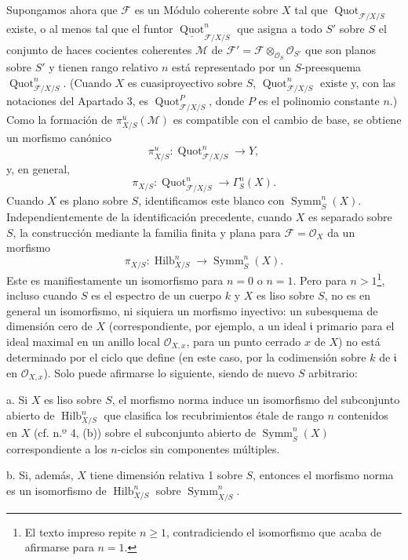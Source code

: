 \documentclass[11pt,twoside,openany]{book}
\numberwithin{equation}{section}
\newcommand{\src}[1]{%
  \phantomsection\hypertarget{src:#1}{}%
  \marginpar{\raggedleft\footnotesize\sffamily #1}%
}
\theoremstyle{plain}
\theoremstyle{definition}
\theoremstyle{remark}
\newcommand{\FgaUnitKey}{frontmatter}
\renewcommand{\src}[1]{%
  \phantomsection\hypertarget{src:\FgaUnitKey:#1}{}%
  \marginpar{\raggedleft\footnotesize\sffamily #1}%
}
\theoremstyle{plain}
\theoremstyle{definition}
\theoremstyle{remark}
\begin{document}
Supongamos ahora que $\mathcal F$ es un Módulo coherente sobre $X$ tal que
$\operatorname{Quot}_{\mathcal F/X/S}$ existe, o al menos tal que el funtor
$\underline{\operatorname{Quot}}^n_{\mathcal F/X/S}$ que asigna a todo $S'$
sobre $S$ el conjunto de haces cocientes coherentes $\mathcal M$ de
$\mathcal F'=\mathcal F\otimes_{\mathcal O_S}\mathcal O_{S'}$ que son planos
sobre $S'$ y tienen rango relativo $n$ está representado por un $S$-preesquema
$\operatorname{Quot}^n_{\mathcal F/X/S}$. (Cuando $X$ es cuasiproyectivo
sobre $S$, $\operatorname{Quot}^n_{\mathcal F/X/S}$ existe y, con las
notaciones del Apartado 3, es $\operatorname{Quot}^P_{\mathcal F/X/S}$, donde
$P$ es el polinomio constante $n$.) Como la formación de
$\pi^u_{X/S}(\mathcal M)$ es compatible con el cambio de base, se obtiene un
morfismo canónico
\[
\pi^u_{X/S}:\operatorname{Quot}^n_{\mathcal F/X/S}\longrightarrow Y,
\]
y, en general,
\[
\pi_{X/S}:\operatorname{Quot}^n_{\mathcal F/X/S}
\longrightarrow\Gamma^n_S(X).
\]
Cuando $X$ es plano sobre $S$, identificamos este blanco con $\operatorname{Symm}^n_S(X)$.
Independientemente de la identificación precedente, cuando $X$ es separado sobre $S$, la construcción mediante la familia finita y plana para $\mathcal F=\mathcal O_X$ da un morfismo
\[
\pi_{X/S}:\operatorname{Hilb}^n_{X/S}
\longrightarrow\operatorname{Symm}^n_S(X).
\]
Este es manifiestamente un isomorfismo para $n=0$ o $n=1$. Pero para
$n>1$\footnote{El texto impreso repite $n\geq1$, contradiciendo el
isomorfismo que acaba de afirmarse para $n=1$.}, incluso cuando $S$ es el
espectro de un cuerpo $k$ y $X$ es liso sobre $S$, no es en general un
isomorfismo, ni siquiera un morfismo inyectivo: un subesquema de dimensión cero
de $X$ (correspondiente, por ejemplo, a un ideal $\mathfrak i$ primario para el
ideal maximal en un anillo local $\mathcal O_{X,x}$, para un punto cerrado $x$
de $X$) no está determinado por el ciclo que define (en este caso, por la
codimensión sobre $k$ de $\mathfrak i$ en $\mathcal O_{X,x}$). Solo puede
afirmarse lo siguiente, siendo de nuevo $S$ arbitrario:

\medskip
\noindent a. Si $X$ es liso sobre $S$, el morfismo norma induce un isomorfismo
del subconjunto abierto de $\operatorname{Hilb}^n_{X/S}$ que clasifica los
recubrimientos étale de rango $n$ contenidos en $X$ (cf. n.º 4, (b)) sobre el
subconjunto abierto de $\operatorname{Symm}^n_S(X)$ correspondiente a los
$n$-ciclos sin componentes múltiples.
\src{275}

\medskip
\noindent b. Si, además, $X$ tiene dimensión relativa 1 sobre $S$, entonces el
morfismo norma es un isomorfismo de $\operatorname{Hilb}^n_{X/S}$ sobre
$\operatorname{Symm}^n_{X/S}$.
\end{document}
